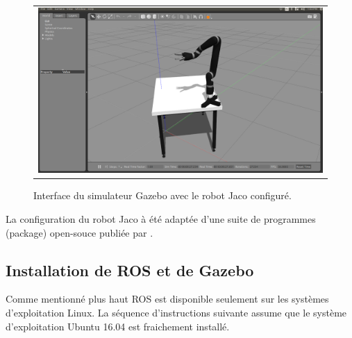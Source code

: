 \documentclass[root.tex]{subfiles}
\begin{document}
\begin{figure}
 \begin{center}
  \begin{tabular}{c}
    \includegraphics[trim=0cm 0cm 0cm 0cm, scale=0.25]{gazebo_jaco.png}
  \end{tabular}
 \end{center}
\caption{Interface du simulateur Gazebo avec le robot Jaco configuré.}
 \label{fig:gazebo_jaco}
\end{figure}

La configuration du robot Jaco à été adaptée d'une suite de programmes (package) open-souce publiée par \cite{jaco_github}.

\subsection{Installation de ROS et de Gazebo}

Comme mentionné plus haut ROS est disponible seulement sur les systèmes d'exploitation Linux.
La séquence d'instructions suivante assume que le système d'exploitation Ubuntu 16.04 est fraichement installé.
\end{document}
